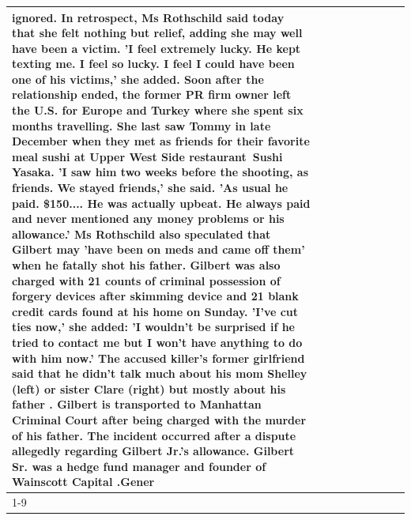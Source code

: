 \begin{table}[H]
\begin{tabular}{lllrlllll}
ignored. In retrospect, Ms Rothschild said today that she felt nothing but relief, adding she may well have been a victim. 'I feel extremely lucky. He kept texting me. I feel so lucky. I feel I could have been one of his victims,' she added. Soon after the relationship ended, the former PR firm owner left the U.S. for Europe and Turkey where she spent six months  travelling. She last saw Tommy in late December when they met as friends for their favorite meal sushi at Upper West Side restaurant Sushi Yasaka. 'I saw him two weeks before the shooting, as friends. We stayed friends,' she said. 'As usual he paid. \$150.... He was actually upbeat. He always paid and never mentioned any money problems or his allowance.' Ms Rothschild also speculated that Gilbert may 'have been on meds and came off them' when he fatally shot his father. Gilbert was also charged with 21 counts of criminal possession of forgery devices after skimming device and 21 blank credit cards found at his home on Sunday. 'I've cut ties now,' she added: 'I wouldn’t be surprised if he tried to contact me but I won’t have anything to do with him now.' The accused killer's former girlfriend said that he didn't talk much about his mom Shelley (left) or sister Clare (right) but mostly about his father . Gilbert is transported to Manhattan Criminal Court  after being charged with the murder of his father. The incident occurred after a dispute allegedly regarding Gilbert Jr.'s allowance. Gilbert Sr. was a hedge fund manager and founder of Wainscott Capital .Gener \\
\cline{1-9} \cline{2-9}

\end{tabular}
\end{table}

